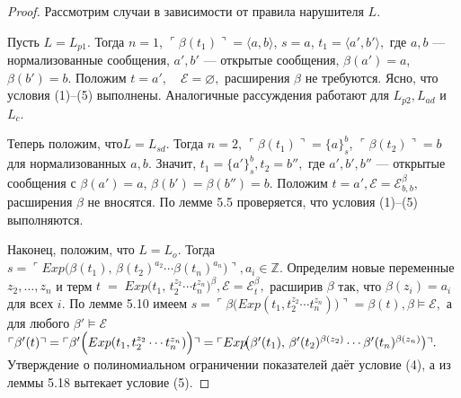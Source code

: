 \begin{proof}
Рассмотрим случаи в зависимости от правила нарушителя \(L\).

\medskip
Пусть \(L = L_{p1}\).  
Тогда \(n=1\), 
\(\ulcorner\beta(t_{1})\urcorner=\langle a,b\rangle\), \(s=a\), 
\(t_{1}=\langle a',b'\rangle,\)
где \(a,b\) — нормализованные сообщения, 
\(a',b'\) — открытые сообщения, 
\(\beta(a')=a\), \(\beta(b')=b\).  
Положим
\(
  t=a',\quad
  \mathcal E=\varnothing,
\)
расширения \(\beta\) не требуются.  
Ясно, что условия (1)–(5) выполнены.  
Аналогичные рассуждения работают для \(L_{p2}, L_{ad}\) и \(L_{c}\).

\medskip
Теперь положим, что\(L=L_{sd}\).  
Тогда \(n=2\),
\(\ulcorner\beta(t_{1})\urcorner=\{a\}_{s}^{b}\), \(\ulcorner\beta(t_{2})\urcorner=b\) для нормализованных
\(a,b\).  Значит,
\(
  t_{1}=\{a'\}_{s}^{b},
  t_{2}=b'',
\)
где \(a',b',b''\) — открытые сообщения с
\(\beta(a')=a\), \(\beta(b')=\beta(b'')=b\).  
Положим
\(
  t=a',
  \mathcal E=\mathcal E^\beta_{b,b},
\)
расширения \(\beta\) не вносятся.  
По лемме 5.5 проверяется, что условия (1)–(5) выполняются.

\medskip
Наконец, положим, что \(L=L_{o}\).  
Тогда
\(
  s = \ulcorner Exp\!\bigl(\beta(t_{1}),\,
         \beta(t_{2})^{a_{2}}\cdots\beta(t_{n})^{a_{n}}\bigr)\urcorner,
  a_{i}\in\mathbb Z.
\)
Определим новые переменные \(z_{2},\dots,z_{n}\) и терм
\(
  t \;=\;
   Exp\!\bigl(t_{1},\,t_{2}^{z_{2}}\cdots t_{n}^{z_{n}}\bigr)^{\beta},
  \mathcal E = \mathcal E_{t}^{\beta},
\)
расширив \(\beta\) так, что \(\beta(z_{i})=a_{i}\) для всех \(i\).  
По лемме 5.10 имеем
\(
  s
    = \ulcorner\beta\bigl( Exp(t_{1},t_{2}^{z_{2}}\cdots t_{n}^{z_{n}})\bigr)\urcorner
    = \beta(t),
  \beta\models\mathcal E,
\)
а для любого \(\beta'\models\mathcal E\)
\(
  \ulcorner\beta'(t)\urcorner
    = \ulcorner\beta'\Bigl( Exp(t_{1},t_{2}^{z_{2}}\cdots t_{n}^{z_{n}})\Bigr)\urcorner
    = \ulcorner Exp\!\bigl(\beta'(t_{1}),\,\beta'(t_{2})^{\beta(z_{2})}\cdots\beta'(t_{n})^{\beta(z_{n})}\bigr)\urcorner.
\)
Утверждение о полиномиальном ограничении показателей даёт условие (4),
а из леммы 5.18 вытекает условие (5).
\end{proof}
